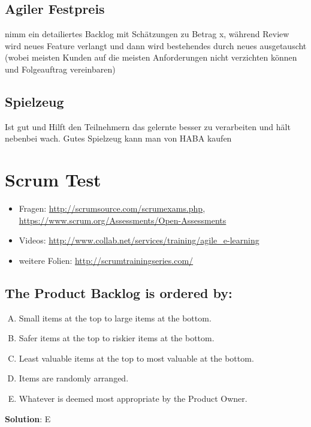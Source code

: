 \subsection{Agiler Festpreis}
nimm ein detailiertes Backlog mit Schätzungen zu Betrag x, während Review wird neues Feature
verlangt und dann wird bestehendes durch neues ausgetauscht (wobei meisten Kunden auf die
meisten Anforderungen nicht verzichten können und Folgeauftrag vereinbaren)


\subsection{Spielzeug}
Ist gut und Hilft den Teilnehmern das gelernte besser zu verarbeiten und hält nebenbei wach.
Gutes Spielzeug kann man von HABA kaufen

\pagebreak

\section{Scrum Test}

\begin{itemize}
  \item Fragen: \url{http://scrumsource.com/scrumexams.php}, \url{https://www.scrum.org/Assessments/Open-Assessments}
  \item Videos: \url{http://www.collab.net/services/training/agile_e-learning}
  \item weitere Folien: \url{http://scrumtrainingseries.com/}
\end{itemize}


\subsection{The Product Backlog is ordered by:}
\begin{enumerate}[A)]
  \item Small items at the top to large items at the bottom.
  \item Safer items at the top to riskier items at the bottom.
  \item Least valuable items at the top to most valuable at the bottom.
  \item Items are randomly arranged.
  \item Whatever is deemed most appropriate by the Product Owner.
\end{enumerate}


\textbf{Solution}: E


